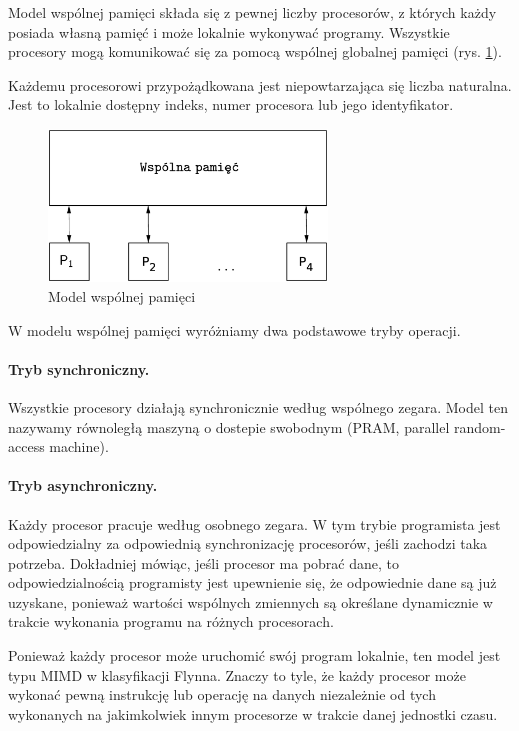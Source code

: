 Model wspólnej pamięci składa się z pewnej liczby procesorów, z których każdy posiada własną pamięć i może lokalnie wykonywać programy. Wszystkie procesory mogą komunikować się za pomocą wspólnej globalnej pamięci (rys. \ref{fig:model_shared}).


Każdemu procesorowi przypożądkowana jest niepowtarzająca się liczba naturalna. Jest to lokalnie dostępny indeks, numer procesora lub jego identyfikator.

\begin{figure}[h]
\centering
\includegraphics[width=20em]{images/Rys4.eps}
\caption{Model wspólnej pamięci}
\label{fig:model_shared}
\end{figure}

W modelu wspólnej pamięci wyróżniamy dwa podstawowe tryby operacji.
\paragraph{Tryb synchroniczny.} Wszystkie procesory działają synchronicznie według wspólnego zegara. Model ten nazywamy równoległą maszyną o dostepie swobodnym (PRAM, parallel random-access machine).


\paragraph{Tryb asynchroniczny.} Każdy procesor pracuje według osobnego zegara. W tym trybie programista jest odpowiedzialny za odpowiednią synchronizację procesorów, jeśli zachodzi taka potrzeba. Dokładniej mówiąc, jeśli procesor ma pobrać dane, to odpowiedzialnością programisty jest upewnienie się, że odpowiednie dane są już uzyskane, ponieważ wartości wspólnych zmiennych są określane dynamicznie w trakcie wykonania programu na różnych procesorach.


Ponieważ każdy procesor może uruchomić swój program lokalnie, ten model jest typu MIMD w klasyfikacji Flynna. Znaczy to tyle, że każdy procesor może wykonać pewną instrukcję lub operację na danych niezależnie od tych wykonanych na jakimkolwiek innym procesorze w trakcie danej jednostki czasu.



